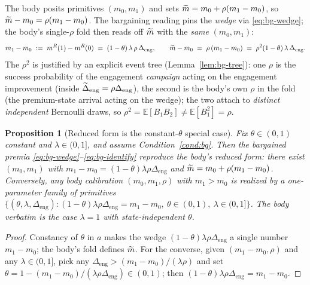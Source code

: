 \documentclass[11pt]{article}
\newtheorem{proposition}{Proposition}
\newcommand{\E}{\mathbb{E}}
\newcommand{\1}{\mathbf{1}}
\begin{document}
The body posits primitives $(m_{0},m_{1})$ and sets $\widetilde{m}=m_{0}+\rho(m_{1}-m_{0})$, so $\widetilde{m}-m_{0}=\rho(m_{1}-m_{0})$. The bargaining reading pins the \emph{wedge} via \eqref{eq:bg-wedge}; the body's single-$\rho$ fold then reads off $\widetilde{m}$ with the \emph{same} $(m_{0},m_{1})$:
\begin{equation}
  \label{eq:bg-identify}
  m_{1}-m_{0}\;:=\;m^{R}(1)-m^{R}(0)\;=\;(1-\theta)\,\lambda\,\rho\,\Delta_{\mathrm{eng}},
  \qquad
  \widetilde{m}-m_{0}\;=\;\rho\,(m_{1}-m_{0})\;=\;\rho^{2}(1-\theta)\,\lambda\,\Delta_{\mathrm{eng}}.
\end{equation}
The $\rho^{2}$ is justified by an explicit event tree (Lemma~\ref{lem:bg-tree}): one $\rho$ is the success probability of the engagement \emph{campaign} acting on the engagement improvement (inside $\widetilde{\Delta}_{\mathrm{eng}}=\rho\Delta_{\mathrm{eng}}$), the second is the body's own $\rho$ in the fold (the premium-state arrival acting on the wedge); the two attach to \emph{distinct independent} Bernoulli draws, so $\rho^{2}=\E[B_{1}B_{2}]\ne\E[B_{1}^{2}]=\rho$.

\begin{proposition}[Reduced form is the constant-$\theta$ special case]
\label{prop:bg-reduced}
Fix $\theta\in(0,1)$ constant and $\lambda\in(0,1]$, and assume Condition~\ref{cond:bg}. Then the bargained premia \eqref{eq:bg-wedge}--\eqref{eq:bg-identify} reproduce the body's reduced form: there exist $(m_{0},m_{1})$ with $m_{1}-m_{0}=(1-\theta)\lambda\rho\Delta_{\mathrm{eng}}$ and $\widetilde{m}=m_{0}+\rho(m_{1}-m_{0})$. Conversely, any body calibration $(m_{0},m_{1},\rho)$ with $m_{1}>m_{0}$ is realized by a one-parameter family of primitives $\{(\theta,\lambda,\Delta_{\mathrm{eng}}):(1-\theta)\lambda\rho\Delta_{\mathrm{eng}}=m_{1}-m_{0},\ \theta\in(0,1),\ \lambda\in(0,1]\}$. The body verbatim is the case $\lambda=1$ with state-independent $\theta$.
\end{proposition}

\begin{proof}
Constancy of $\theta$ in $a$ makes the wedge $(1-\theta)\lambda\rho\Delta_{\mathrm{eng}}$ a single number $m_{1}-m_{0}$; the body's fold defines $\widetilde{m}$. For the converse, given $(m_{1}-m_{0},\rho)$ and any $\lambda\in(0,1]$, pick any $\Delta_{\mathrm{eng}}>(m_{1}-m_{0})/(\lambda\rho)$ and set $\theta=1-(m_{1}-m_{0})/(\lambda\rho\Delta_{\mathrm{eng}})\in(0,1)$; then $(1-\theta)\lambda\rho\Delta_{\mathrm{eng}}=m_{1}-m_{0}$.
\end{proof}
\end{document}
